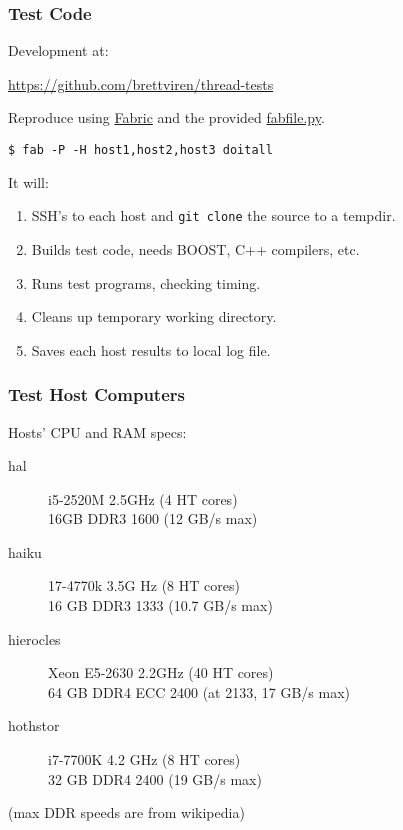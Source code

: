 \documentclass[xcolor=dvipsnames]{beamer}
\begin{document}
\begin{frame}
  \frametitle{Test Code}
  Development at:
  \begin{center}
    \url{https://github.com/brettviren/thread-tests}
  \end{center}
Reproduce using \href{http://www.fabfile.org/}{Fabric} and the provided \href{https://raw.githubusercontent.com/brettviren/thread-tests/master/fabfile.py}{fabfile.py}.
\begin{verbatim}
$ fab -P -H host1,host2,host3 doitall
\end{verbatim}
It will:
\begin{enumerate}\footnotesize
\item SSH's to each host and \texttt{git clone} the source to a tempdir.
\item Builds test code, needs BOOST, C++ compilers, etc.
\item Runs test programs, checking timing.
\item Cleans up temporary working directory.
\item Saves each host results to local log file.
\end{enumerate}
\end{frame}



\begin{frame}
  \frametitle{Test Host Computers}
  
  Hosts' CPU and RAM specs:
  \begin{description}
  \item[hal] i5-2520M 2.5GHz (4 HT cores) \\ 16GB DDR3 1600 (12 GB/s max)
  \item[haiku] 17-4770k 3.5G Hz (8 HT cores) \\ 16 GB DDR3 1333 (10.7 GB/s max)
  \item[hierocles] Xeon E5-2630 2.2GHz (40 HT cores) \\ 64 GB DDR4 ECC 2400 (at 2133, 17 GB/s max)
  \item[hothstor] i7-7700K 4.2 GHz (8 HT cores) \\ 32 GB DDR4 2400 (19 GB/s max)
  \end{description}
  \begin{center}\footnotesize
    (max DDR speeds are from wikipedia)    
  \end{center}
\end{frame}
\end{document}
